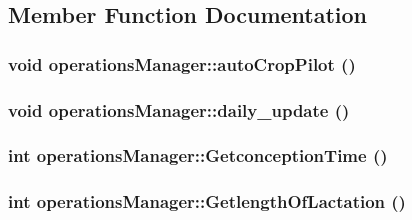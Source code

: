\subsection{Member Function Documentation}
\hypertarget{classoperations_manager_a82f5de5d5b758b49958440abb7e37312}{
\subsubsection[{autoCropPilot}]{\setlength{\rightskip}{0pt plus 5cm}void operationsManager::autoCropPilot ()}}
\label{classoperations_manager_a82f5de5d5b758b49958440abb7e37312}
\hypertarget{classoperations_manager_a028a7ab1978e41ea742d248b2fce3835}{
\subsubsection[{daily\_\-update}]{\setlength{\rightskip}{0pt plus 5cm}void operationsManager::daily\_\-update ()}}
\label{classoperations_manager_a028a7ab1978e41ea742d248b2fce3835}
\hypertarget{classoperations_manager_abbf6d4466cfb097146e1957fdbf0b629}{
\subsubsection[{GetconceptionTime}]{\setlength{\rightskip}{0pt plus 5cm}int operationsManager::GetconceptionTime ()}}
\label{classoperations_manager_abbf6d4466cfb097146e1957fdbf0b629}
\hypertarget{classoperations_manager_ae313974b71c982f6b4ae24e96f6274e2}{
\subsubsection[{GetlengthOfLactation}]{\setlength{\rightskip}{0pt plus 5cm}int operationsManager::GetlengthOfLactation ()}}
